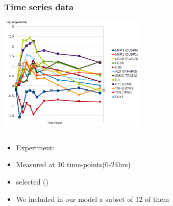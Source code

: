 \begin{frame}[c]
  \frametitle{Time series data}
  
\begin{center}
  \includegraphics[width=70mm]{figs/12genes.png}
\end{center}


\begin{columns}
\begin{column}{0.7\textwidth}
\begin{itemize}
  \item Experiment: 
  \item Measured at 10 time-points(0-24hrs)
  \item {} selected  () %
  \item We included in our model a subset of $12$ of them
\end{itemize}
\end{column}

\begin{column}{0.3\textwidth}

\end{column}
\end{columns}

\end{frame}



